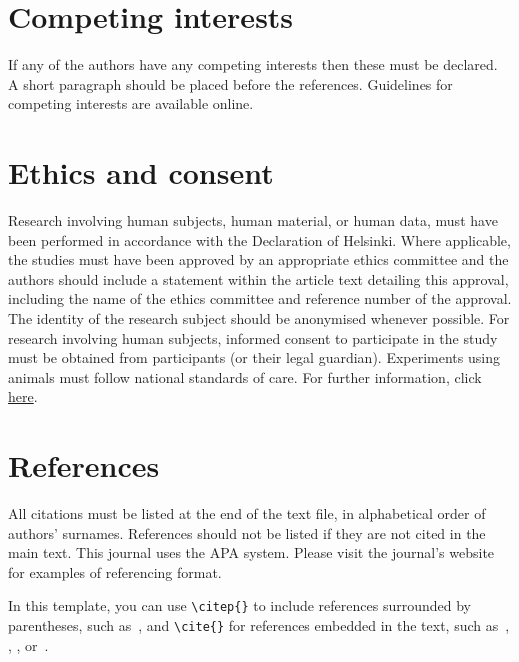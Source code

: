 \documentclass[ProofPDF]{./Styles/Jnls-Template-V3}
\begin{document}
\section{Competing interests}

If any of the authors have any competing interests then these
must be declared. A short paragraph should be placed before
the references.
Guidelines for competing interests are available online.%


\section{Ethics and consent}

Research involving human subjects, human material, or human data,
must have been performed in accordance with the Declaration of Helsinki.
Where applicable, the studies must have been approved by an appropriate
ethics committee and the authors should include a statement within
the article text detailing this approval, including the name of the ethics committee and reference number of the approval.
The identity of the research subject should be anonymised whenever possible.
For research involving human subjects, informed consent to participate
in the study must be obtained from participants (or their legal guardian).
%
Experiments using animals must follow national standards of care.
For further information, click \href{http://bit.ly/1rBoe0S}{here}.


\section{References}

All citations must be listed at the end of the text file,
in alphabetical order of authors' surnames.
References should not be listed if they are not cited in
the main text.
This journal uses the APA system.
Please visit the journal's website
for examples of referencing format.

In this template, you can use \verb=\citep{}= to include references
surrounded by parentheses, such as~\citep{KneesS16_MusicSimilarityRetrieval_SPRINGER}, and \verb=\cite{}=
for references embedded in the text,
such as~\cite{WeihsJVR16_MusicDataAnalysis_CRC},
\cite{SerraEtAl13_RoadmapMIR_CreativeCommon},
\cite{Lerch23_AudioContentAnalysis_WILEY},
or~\cite{Mueller21_FMP_SPRINGER}.
\end{document}
